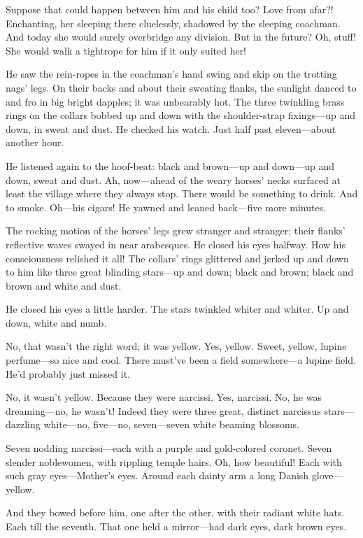 \documentclass[12pt,a4paper]{article}
\begin{document}
Suppose that could happen between him and his child too? Love from afar?! Enchanting, her sleeping there cluelessly, shadowed by the sleeping coachman. And today she would surely overbridge any division. But in the future? Oh, stuff! She would walk a tightrope for him if it only suited her!

He saw the rein-ropes in the coachman’s hand swing and skip on the trotting nags’ legs. On their backs and about their sweating flanks, the sunlight danced to and fro in big bright dapples; it was unbearably hot. The three twinkling brass rings on the collars bobbed up and down with the shoulder-strap fixings—up and down, in sweat and dust. He checked his watch. Just half past eleven—about another hour. 

He listened again to the hoof-beat: black and brown—up and down—up and down, sweat and dust. Ah, now—ahead of the weary horses’ necks surfaced at least the village where they always stop. There would be something to drink. And to smoke. Oh—his cigars! He yawned and leaned back—five more minutes.

The rocking motion of the horses’ legs grew stranger and stranger; their flanks’ reflective waves swayed in near arabesques. He closed his eyes halfway. How his consciousness relished it all! The collars’ rings glittered and jerked up and down to him like three great blinding stars—up and down; black and brown; black and brown and white and dust.

He closed his eyes a little harder. The stars twinkled whiter and whiter. Up and down, white and numb.

No, that wasn’t the right word; it was yellow. Yes, yellow. Sweet, yellow, lupine perfume—so nice and cool. There must’ve been a field somewhere—a lupine field. He’d probably just missed it.

No, it wasn’t yellow. Because they were narcissi. Yes, narcissi. No, he was dreaming—no, he wasn’t! Indeed they were three great, distinct narcissus stars—dazzling white—no, five—no, seven—seven white beaming blossoms. 

Seven nodding narcissi—each with a purple and gold-colored coronet. Seven slender noblewomen, with rippling temple hairs. Oh, how beautiful! Each with such gray eyes—Mother’s eyes. Around each dainty arm a long Danish glove—yellow.

And they bowed before him, one after the other, with their radiant white hats. Each till the seventh. That one held a mirror—had dark eyes, dark brown eyes.
\end{document}
